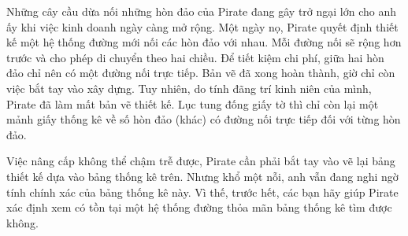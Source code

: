 Những cây cầu dừa nối những hòn đảo của Pirate đang gây trở ngại lớn cho anh ấy khi việc kinh doanh ngày càng mở rộng. Một ngày nọ, Pirate quyết định thiết kế một hệ thống đường mới nối các hòn đảo với nhau. Mỗi đường nối sẽ rộng hơn trước và cho phép di chuyển theo hai chiều. Để tiết kiệm chi phí, giữa hai hòn đảo chỉ nên có một đường nối trực tiếp. Bản vẽ đã xong hoàn thành, giờ chỉ còn việc bắt tay vào xây dựng. Tuy nhiên, do tính đãng trí kinh niên của mình, Pirate đã làm mất bản vẽ thiết kế. Lục tung đống giấy tờ thì chỉ còn lại một mảnh giấy thống kê về số hòn đảo (khác) có đường nối trực tiếp đối với từng hòn đảo.

Việc nâng cấp không thể chậm trễ được, Pirate cần phải bắt tay vào vẽ lại bảng thiết kế dựa vào bảng thống kê trên. Nhưng khổ một nỗi, anh vẫn đang nghi ngờ tính chính xác của bảng thống kê này. Vì thế, trước hết, các bạn hãy giúp Pirate xác định xem có tồn tại một hệ thống đường thỏa mãn bảng thống kê tìm được không.
